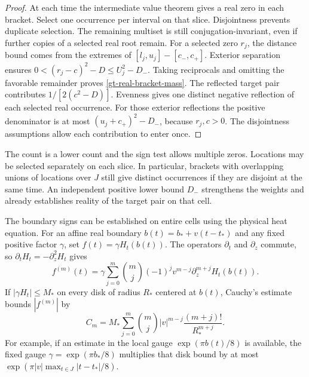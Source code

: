\begin{proof}
At each time the intermediate value theorem gives a real zero in
each bracket. Select one occurrence per interval on that slice.
Disjointness prevents duplicate selection. The remaining multiset
is still conjugation-invariant, even if further copies of a selected
real root remain. For a selected zero \(r_j\), the distance bound
comes from the extremes of \([l_j,u_j]-[c_-,c_+]\). Exterior
separation ensures \(0<(r_j-c)^2-D\le U_j^2-D_-\). Taking
reciprocals and omitting the favorable remainder proves
\eqref{gt-real-bracket-mass}. The reflected target pair contributes
\(1/[2(c^2-D)]\). Evenness gives one distinct negative reflection of
each selected real occurrence. For those exterior reflections the
positive denominator is at most \((u_j+c_+)^2-D_-\), because
\(r_j,c>0\). The disjointness assumptions allow each contribution
to enter once.
\end{proof}

The count is a lower count and the sign test allows multiple zeros.
Locations may be selected separately on each slice. In particular,
brackets with overlapping unions of locations over \(J\) still give
distinct occurrences if they are disjoint at the same time. An
independent positive lower bound \(D_-\) strengthens the weights and
already establishes reality of the target pair on that cell.

The boundary signs can be established on entire cells using the
physical heat equation. For an affine real boundary
\(b(t)=b_*+v(t-t_*)\) and any fixed positive factor \(\gamma\), set
\(f(t)=\gamma H_t(b(t))\). The operators \(\partial_t\) and
\(\partial_z\) commute, so \(\partial_t H_t=-\partial_z^2H_t\) gives
\begin{equation}
 f^{(m)}(t)=\gamma\sum_{j=0}^m\binom mj(-1)^jv^{m-j}
                     \partial_z^{m+j}H_t(b(t)).
 \label{gt-moving-boundary-derivative}
\end{equation}
If \(|\gamma H_t|\le M_*\) on every disk of radius \(R_*\) centered
at \(b(t)\), Cauchy's estimate bounds \(|f^{(m)}|\) by
\[
 C_m=M_*\sum_{j=0}^m\binom mj |v|^{m-j}
                     \frac{(m+j)!}{R_*^{m+j}} .
\]
For example, if an estimate in the local gauge
\(\exp(\pi b(t)/8)\) is available, the fixed gauge
\(\gamma=\exp(\pi b_*/8)\) multiplies that disk bound by at most
\(\exp(\pi |v|\max_{t\in J}|t-t_*|/8)\).

